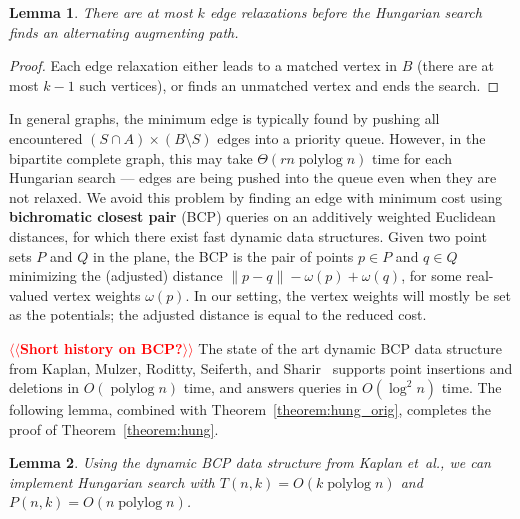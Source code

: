 \documentclass[11pt]{article}
\makeatletter
\def\etal{\textit{et~al.}}
\def\polylog{\mathop{\mathrm{polylog}}}
\theoremstyle{plain}
\newtheorem{lemma}{Lemma}[section]
\numberwithin{figure}{section}
\def\EMPH#1{\textbf{\boldmath #1}}
\def\n@te#1{\textsf{\boldmath \textbf{$\langle\!\langle$#1$\rangle\!\rangle$}}\leavevmode}
\def\note#1{\textcolor{red}{\n@te{#1}}}
\makeatother
\begin{document}
\begin{lemma}
\label{lemma:hungsearch_length}
There are at most $k$ edge relaxations before the Hungarian search finds an
alternating augmenting path.
\end{lemma}

\begin{proof}
Each edge relaxation either leads to a matched vertex in $B$ (there are at most
$k-1$ such vertices), or finds an unmatched vertex and ends the search.
\end{proof}

In general graphs, the minimum edge is typically found by pushing all
encountered $(S \cap A) \times (B \setminus S)$ edges into a priority queue.
However, in the bipartite complete graph, this may take $\Theta(rn\polylog n)$
time for each Hungarian search --- edges are being pushed into the queue even when
they are not relaxed.
We avoid this problem by finding an edge with minimum cost using \EMPH{bichromatic
closest pair} (BCP) queries on an additively weighted Euclidean distances,
for which there exist fast dynamic data structures.
Given two point sets $P$ and $Q$ in the plane, the BCP is the pair of points
$p \in P$ and $q \in Q$ minimizing the (adjusted) distance
$\|p - q\| - \omega(p) + \omega(q)$, for some real-valued vertex weights
$\omega(p)$.
In our setting, the vertex weights will mostly be set as the potentials; the
adjusted distance is equal to the reduced cost.

\note{Short history on BCP?}
The state of the art dynamic BCP data structure from Kaplan, Mulzer,
Roditty, Seiferth, and Sharir~\cite{KMRSS17} supports point insertions and deletions in
$O(\polylog n)$ time, and answers queries in $O(\log^2 n)$ time.
The following lemma, combined with Theorem~\ref{theorem:hung_orig}, completes
the proof of Theorem~\ref{theorem:hung}.

\begin{lemma}
\label{lemma:hs_time}
Using the dynamic BCP data structure from Kaplan \etal, we can implement
Hungarian search with $T(n, k) = O(k\polylog n)$ and
$P(n, k) = O(n\polylog n)$.
\end{lemma}
\end{document}
